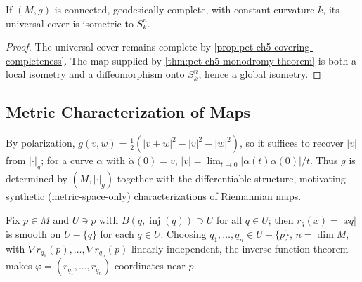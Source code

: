 \begin{corollary}
  \label{cor:pet-ch5-classification-constant-curvature}

  If $(M,g)$ is connected, geodesically complete, with constant curvature $k$, its
  universal cover is isometric to $S^n_k$.
\end{corollary}
\begin{proof}
  \sketch
  The universal cover remains complete by
  \cref{prop:pet-ch5-covering-completeness}.  The map supplied by
  \cref{thm:pet-ch5-monodromy-theorem} is both a local isometry and a
  diffeomorphism onto $S_k^n$, hence a global isometry.
\end{proof}

\subsection{Metric Characterization of Maps}

\begin{remark}
  \label{rem:pet-ch5-polarization-metric-recovery}

  By polarization, $g(v,w)=\tfrac12(|v+w|^2-|v|^2-|w|^2)$, so it suffices to
  recover $|v|$ from $|\cdot|_g$; for a curve $\alpha$ with $\dot\alpha(0)=v$,
  $|v|=\lim_{t\to0}|\alpha(t)\alpha(0)|/t$. Thus $g$ is determined by
  $(M,|\cdot|_g)$ together with the differentiable structure, motivating synthetic
  (metric-space-only) characterizations of Riemannian maps.
\end{remark}

\begin{definition}
  \label{def:pet-ch5-distance-coordinates}


  Fix $p\in M$ and $U\ni p$ with $B(q,\operatorname{inj}(q))\supset U$ for all
  $q\in U$; then $r_q(x)=|xq|$ is smooth on $U-\{q\}$ for each $q\in U$. Choosing
  $q_1,\dots,q_n\in U-\{p\}$, $n=\dim M$, with $\nabla r_{q_1}(p),\dots,\nabla
  r_{q_n}(p)$ linearly independent, the inverse function theorem makes
  $\varphi=(r_{q_1},\dots,r_{q_n})$ coordinates near $p$.
\end{definition}

